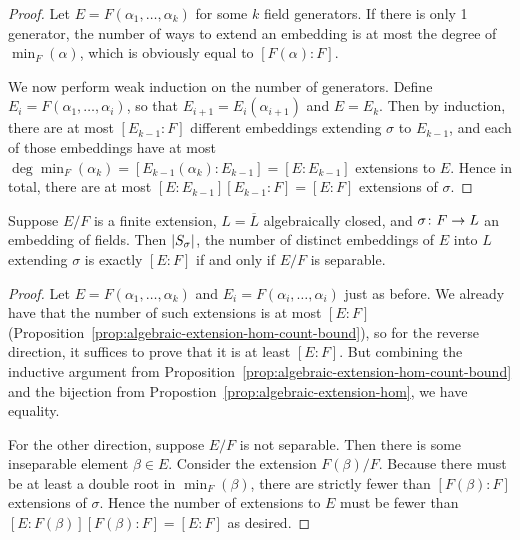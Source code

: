 \begin{proof}
    Let \(E = F(\alpha_1,\hdots,\alpha_k)\) for some \(k\) field generators.
    If there is only 1 generator,
    the number of ways to extend an embedding is at most the degree of \(\min_F(\alpha)\),
    which is obviously equal to \([F(\alpha):F]\).

    We now perform weak induction on the number of generators.
    Define \(E_i = F(\alpha_1,\hdots,\alpha_i)\),
    so that \(E_{i+1} = E_i(\alpha_{i+1})\) and \(E = E_k\).
    Then by induction, there are at most \([E_{k-1}:F]\) different embeddings
    extending \(\sigma\) to \(E_{k-1}\),
    and each of those embeddings have at most
    \(\deg\min_F(\alpha_k) = [E_{k-1}(\alpha_k):E_{k-1}] = [E:E_{k-1}]\) extensions to \(E\).
    Hence in total, there are at most \([E:E_{k-1}][E_{k-1}:F] = [E:F]\) extensions of \(\sigma\).
\end{proof}
\begin{theorem}\label{thm:algebraic-extension-hom-count}
    Suppose \(E/F\) is a finite extension,
    \(L = \overline{L}\) algebraically closed,
    and \(\sigma\colon F\to L\) an embedding of fields.
    Then \(\abs{S_\sigma}\),
    the number of distinct embeddings of \(E\) into \(L\) extending \(\sigma\)
    is exactly \([E:F]\) if and only if \(E/F\) is separable.
\end{theorem}
\begin{proof}
    Let \(E = F(\alpha_1,\hdots,\alpha_k)\) and \(E_i = F(\alpha_i,\hdots,\alpha_i)\) just as before.
    We already have that the number of such extensions is at most \([E:F]\) (Proposition~\ref{prop:algebraic-extension-hom-count-bound}),
    so for the reverse direction, it suffices to prove that it is at least \([E:F]\).
    But combining the inductive argument from Proposition~\ref{prop:algebraic-extension-hom-count-bound}
    and the bijection from Propostion~\ref{prop:algebraic-extension-hom},
    we have equality.

    For the other direction, suppose \(E/F\) is not separable.
    Then there is some inseparable element \(\beta \in E\).
    Consider the extension \(F(\beta)/F\).
    Because there must be at least a double root in \(\min_F(\beta)\),
    there are strictly fewer than \([F(\beta):F]\) extensions of \(\sigma\).
    Hence the number of extensions to \(E\) must be fewer than \([E:F(\beta)][F(\beta):F] = [E:F]\) as desired.
\end{proof}

